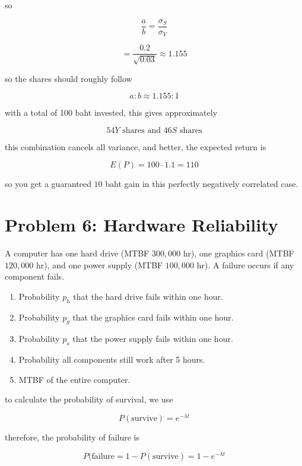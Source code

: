 \begin{enumerate}
so

\[
\frac{a}{b}=\frac{\sigma_S}{\sigma_Y}
\]

\[
=\frac{0.2}{\sqrt{0.03}}\approx1.155
\]

so the shares should roughly follow

\[
a:b\approx1.155:1
\]

with a total of 100 baht invested, this gives approximately

\[
\boxed{54Y \text{ shares and } 46S \text{ shares}}
\]

this combination cancels all variance, and better, the expected return is

\[
E(P)=100\cdot1.1=\boxed{110}
\]

so you get a guaranteed $10$ baht gain in this perfectly negatively correlated case.

\end{enumerate}

\vspace{1em}
\hrulefill

\section*{Problem 6: Hardware Reliability}
A computer has one hard drive (MTBF $300{,}000$ hr), one graphics card (MTBF $120{,}000$ hr), and one power supply (MTBF $100{,}000$ hr). A failure occurs if any component fails.
\begin{enumerate}[label=\arabic*.]
    \item Probability $p_h$ that the hard drive fails within one hour.
    \item Probability $p_g$ that the graphics card fails within one hour.
    \item Probability $p_s$ that the power supply fails within one hour.
    \item Probability all components still work after 5 hours.
    \item MTBF of the entire computer.
\end{enumerate}

\medskip
\solution

to calculate the probability of survival, we use 

\[P(\text{survive}) = e^{-\lambda {t}}\]

therefore, the probability of failure is

\[P(\text{failure} = 1 - P(\text{survive}) = 1 - e^{-\lambda {t}}\]

